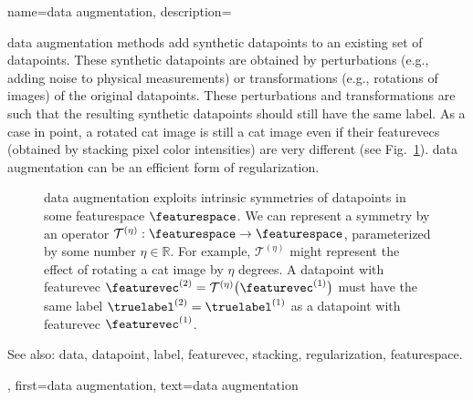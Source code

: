 {name={data augmentation},
	description={\Gls{data} augmentation methods add synthetic \glspl{datapoint} 
		to an existing set of \glspl{datapoint}. These synthetic \glspl{datapoint} are obtained by 
		perturbations (e.g., adding noise to physical measurements) or transformations 
		(e.g., rotations of images) of the original \glspl{datapoint}. These perturbations and 
		transformations are such that the resulting synthetic \glspl{datapoint} should 
		still have the same \gls{label}. As a case in point, a rotated cat image is still 
		a cat image even if their \glspl{featurevec} (obtained by \gls{stacking} pixel color intensities) 
		are very different (see Fig.\ \ref{fig_symmetry_dataaug_dict}). \Gls{data} augmentation can be an 
		efficient form of \gls{regularization}.
		\begin{figure}[H]
		\begin{center}
			  \vspace*{-11mm}
		\end{center}
		\caption{\Gls{data} augmentation exploits intrinsic symmetries of \glspl{datapoint} in 
			some \gls{featurespace} $\featurespace$. We can represent a symmetry by 
		    	an \gls{operator} $\mathcal{T}^{(\eta)}: \featurespace \rightarrow \featurespace$,
		    	parameterized by some number $\eta \in \mathbb{R}$. For example, $\mathcal{T}^{(\eta)}$ 
		    	might represent the effect of rotating a cat image by $\eta$ degrees. A \gls{datapoint} 
		    	with \gls{featurevec} $\featurevec^{(2)} = \mathcal{T}^{(\eta)} \big(\featurevec^{(1)} \big)$ must 
		    	have the same \gls{label} $\truelabel^{(2)}=\truelabel^{(1)}$ as a \gls{datapoint} 
		   	 with \gls{featurevec} $\featurevec^{(1)}$.\label{fig_symmetry_dataaug_dict}}
		 \end{figure}
		See also: \gls{data}, \gls{datapoint}, \gls{label}, \gls{featurevec}, \gls{stacking}, \gls{regularization}, \gls{featurespace}. },
	first={data augmentation},
	text={data augmentation}
}
	
